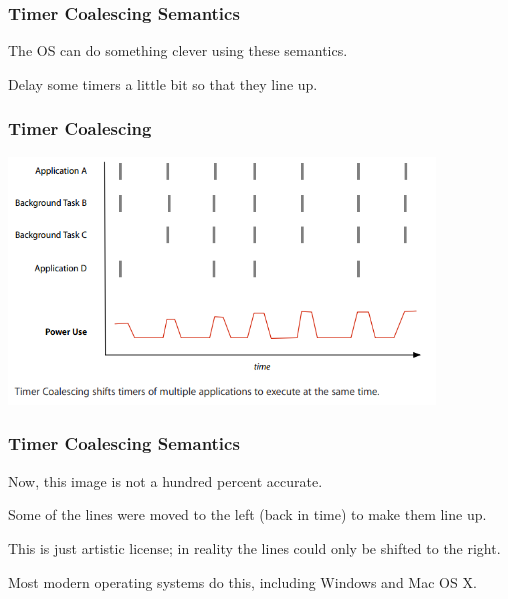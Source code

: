 \begin{frame}
\frametitle{Timer Coalescing Semantics}
\begin{changemargin}{1cm}

The OS can do something clever using these semantics.

Delay some timers a little bit so that they line up.

\end{changemargin}
\end{frame}

\begin{frame}
\frametitle{Timer Coalescing}
\begin{center}
	\includegraphics[width=0.85\textwidth]{images/coalesced-after.png}
\end{center}

\end{frame}


\begin{frame}
\frametitle{Timer Coalescing Semantics}
\begin{changemargin}{1cm}

Now, this image is not a hundred percent accurate. 

Some of the lines were moved to the left (back in time) to make them line up. 

This is just artistic license; in reality the lines could only be shifted to the right.

Most modern operating systems do this, including Windows and Mac OS X.

\end{changemargin}
\end{frame}



